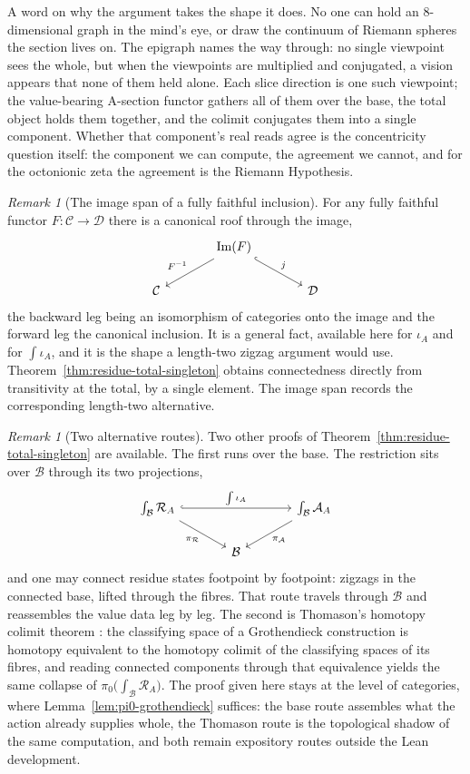 \documentclass[11pt]{article}
\theoremstyle{plain}
\theoremstyle{definition}
\theoremstyle{remark}
\newtheorem{remark}[theorem]{Remark}
\begin{document}
A word on why the argument takes the shape it does. No one can hold an $8$-dimensional graph in the
mind's eye, or draw the continuum of Riemann spheres the section lives on. The epigraph names the
way through: no single viewpoint sees the whole, but when the viewpoints are multiplied and
conjugated, a vision appears that none of them held alone. Each slice direction is one such
viewpoint; the value-bearing A-section functor gathers all of them over the base, the total object holds them
together, and the colimit conjugates them into a single component. Whether that component's
real reads agree is the concentricity question itself: the component we can compute, the
agreement we cannot, and for the octonionic zeta the agreement is the Riemann Hypothesis.

\begin{remark}[The image span of a fully faithful inclusion]\label{rmk:image-span}
For any fully faithful functor $F:\mathcal C\to\mathcal D$ there is a canonical roof through
the image,
\[
\begin{tikzcd}[column sep=large]
& \operatorname{Im}(F) \arrow[dl, "F^{-1}"'] \arrow[dr, hook, "j"] & \\
\mathcal C & & \mathcal D
\end{tikzcd}
\]
the backward leg being an isomorphism of categories onto the image and the forward leg the
canonical inclusion. It is a general fact, available here for $\iota_A$ and for
$\int\iota_A$, and it is the shape a length-two zigzag argument would use.
Theorem~\ref{thm:residue-total-singleton} obtains connectedness directly from transitivity at the total,
by a single element. The image span records the corresponding length-two alternative.
\end{remark}

\begin{remark}[Two alternative routes]\label{rmk:thomason}
Two other proofs of Theorem~\ref{thm:residue-total-singleton} are available. The first runs over the
base. The restriction sits over $\mathcal B$ through its two projections,
\[
\begin{tikzcd}[column sep=large]
\int_{\mathcal B}\mathcal R_A \arrow[rr, hook, "\int\iota_A"] \arrow[dr, "\pi_{\mathcal R}"'] & &
\int_{\mathcal B}\mathcal A_A \arrow[dl, "\pi_{\mathcal A}"] \\
& \mathcal B &
\end{tikzcd}
\]
and one may connect residue states footpoint by footpoint: zigzags in the connected base,
lifted through the fibres. That route travels through $\mathcal B$ and reassembles the value data
leg by leg. The second is Thomason's homotopy colimit theorem \cite{Thomason79}: the
classifying space of a Grothendieck construction is homotopy equivalent to the homotopy
colimit of the classifying spaces of its fibres, and reading connected components through that
equivalence yields the same collapse of $\pi_0\bigl(\int_{\mathcal B}\mathcal R_A\bigr)$. The
proof given here stays at the level of categories, where Lemma~\ref{lem:pi0-grothendieck}
suffices: the base route assembles what the action already supplies whole, the Thomason route
is the topological shadow of the same computation, and both remain expository routes outside
the Lean development.
\end{remark}
\end{document}
